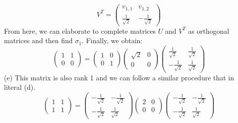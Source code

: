 \documentclass{article}
\begin{document}
\begin{enumerate}
$$V^T = \left( \begin{array}{cc} v_{1,1} & v_{1,2} \\  \frac{1}{\sqrt{2}} & -\frac{1}{\sqrt{2}}  \end{array} \right)$$
From here, we can elaborate to complete matrices $U$ and $V^T$ as orthogonal matrices and then find $\sigma_1$.  Finally, we obtain:
$$\left( \begin{array}{cc} 1 & 1 \\ 0 & 0  \end{array} \right) = 
\left( \begin{array}{cc} 1 & 0 \\ 0 & 1  \end{array} \right)
\left( \begin{array}{cc} \sqrt{2} & 0 \\ 0 & 0  \end{array} \right)
\left( \begin{array}{cc} \frac{1}{\sqrt{2}} & \frac{1}{\sqrt{2}} \\ -\frac{1}{\sqrt{2}} & \frac{1}{\sqrt{2}}  \end{array} \right)$$
(e) This matrix is also rank 1 and we can follow a similar procedure that in literal (d).
$$\left( \begin{array}{cc} 1 & 1 \\ 1 & 1  \end{array} \right) = 
\left( \begin{array}{cc} -\frac{1}{\sqrt{2}} & -\frac{1}{\sqrt{2}} \\ -\frac{1}{\sqrt{2}} & \frac{1}{\sqrt{2}}  \end{array} \right)
\left( \begin{array}{cc} 2 & 0 \\ 0 & 0  \end{array} \right)
\left( \begin{array}{cc} -\frac{1}{\sqrt{2}} & -\frac{1}{\sqrt{2}} \\ -\frac{1}{\sqrt{2}} & \frac{1}{\sqrt{2}}  \end{array} \right)$$


\end{enumerate}
\end{document}
